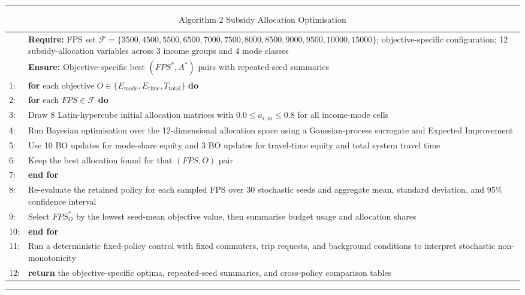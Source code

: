 \documentclass[a4paper,fleqn]{cas-sc}
\begin{document}
\begin{table}[width=\textwidth]
\caption{Algorithm 2 Subsidy Allocation Optimisation}
\label{alg:subsidy-opt}
\hrule height 1pt
\vspace{0.5em}
\small
\begin{tabularx}{\textwidth}{p{}Y}
& \textbf{Require:} FPS set $\mathcal{F} = \{3500, 4500, 5500, 6500, 7000, 7500, 8000, 8500, 9000, 9500, 10000, 15000\}$; objective-specific configuration; 12 subsidy-allocation variables across 3 income groups and 4 mode classes \\
& \textbf{Ensure:} Objective-specific best $(FPS^*, A^*)$ pairs with repeated-seed summaries \\
1: & \textbf{for} each objective $O \in \{E_{\text{mode}}, E_{\text{time}}, T_{\text{total}}\}$ \textbf{do} \\
2: & \hspace{1em} \textbf{for} each $FPS \in \mathcal{F}$ \textbf{do} \\
3: & \hspace{2em} Draw 8 Latin-hypercube initial allocation matrices with $0.0 \leq a_{i,m} \leq 0.8$ for all income-mode cells \\
4: & \hspace{2em} Run Bayesian optimisation over the 12-dimensional allocation space using a Gaussian-process surrogate and Expected Improvement \\
5: & \hspace{2em} Use 10 BO updates for mode-share equity and 3 BO updates for travel-time equity and total system travel time \\
6: & \hspace{2em} Keep the best allocation found for that $(FPS, O)$ pair \\
7: & \hspace{1em} \textbf{end for} \\
8: & \hspace{1em} Re-evaluate the retained policy for each sampled FPS over 30 stochastic seeds and aggregate mean, standard deviation, and 95\% confidence interval \\
9: & \hspace{1em} Select $FPS_O^*$ by the lowest seed-mean objective value, then summarise budget usage and allocation shares \\
10: & \textbf{end for} \\
11: & Run a deterministic fixed-policy control with fixed commuters, trip requests, and background conditions to interpret stochastic non-monotonicity \\
12: & \textbf{return} the objective-specific optima, repeated-seed summaries, and cross-policy comparison tables \\
\end{tabularx}
\vspace{0.5em}
\hrule height 1pt
\end{table}
\end{document}
